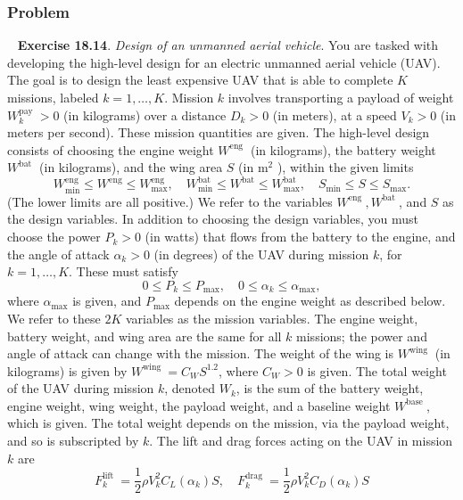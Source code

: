 \documentclass[12pt,reqno]{article}
\theoremstyle{definition}
\numberwithin{equation}{section}
\begin{document}
\subsubsection*{Problem}
    \noindent~\cite{EE364a-extra} \textbf{Exercise 18.14}. \textit{Design of an unmanned aerial vehicle}.
    You are tasked with developing the high-level design for an electric unmanned aerial vehicle (UAV). The goal is to design the least expensive UAV that is able to complete $K$ missions, labeled $k=1, \ldots, K$. Mission $k$ involves transporting a payload of weight $W_k^{\text {pay }}>0$ (in kilograms) over a distance $D_k>0$ (in meters), at a speed $V_k>0$ (in meters per second). These mission quantities are given.
    The high-level design consists of choosing the engine weight $W^{\text {eng }}$ (in kilograms), the battery weight $W^{\text {bat }}$ (in kilograms), and the wing area $S$ (in $\mathrm{m}^2$ ), within the given limits
    \[
    W_{\min }^{\mathrm{eng}} \leq W^{\mathrm{eng}} \leq W_{\max }^{\mathrm{eng}}, \quad W_{\min }^{\mathrm{bat}} \leq W^{\mathrm{bat}} \leq W_{\max }^{\mathrm{bat}}, \quad S_{\min } \leq S \leq S_{\max } .
    \]
    (The lower limits are all positive.) We refer to the variables $W^{\text {eng }}, W^{\text {bat }}$, and $S$ as the design variables.
    In addition to choosing the design variables, you must choose the power $P_k>0$ (in watts) that flows from the battery to the engine, and the angle of attack $\alpha_k>0$ (in degrees) of the UAV during mission $k$, for $k=1, \ldots, K$. These must satisfy
    \[
    0 \leq P_k \leq P_{\max }, \quad 0 \leq \alpha_k \leq \alpha_{\max },
    \]
    where $\alpha_{\max }$ is given, and $P_{\max }$ depends on the engine weight as described below. We refer to these $2 K$ variables as the mission variables. The engine weight, battery weight, and wing area are the same for all $k$ missions; the power and angle of attack can change with the mission.
    The weight of the wing is $W^{\text {wing }}$ (in kilograms) is given by $W^{\text {wing }}=C_W S^{1.2}$, where $C_W>0$ is given. The total weight of the UAV during mission $k$, denoted $W_k$, is the sum of the battery weight, engine weight, wing weight, the payload weight, and a baseline weight $W^{\text {base }}$, which is given. The total weight depends on the mission, via the payload weight, and so is subscripted by $k$.
    The lift and drag forces acting on the UAV in mission $k$ are
    \[
    F_k^{\text {lift }}=\frac{1}{2} \rho V_k^2 C_L\left(\alpha_k\right) S, \quad F_k^{\text {drag }}=\frac{1}{2} \rho V_k^2 C_D\left(\alpha_k\right) S
    \]
\end{document}

